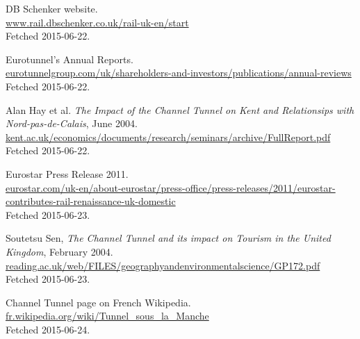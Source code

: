 \documentclass[12pt]{article} %
\begin{document}
\begin{thebibliography}{99}
	DB Schenker website.\\
	\url{www.rail.dbschenker.co.uk/rail-uk-en/start}\\
	Fetched 2015-06-22.

	Eurotunnel's Annual Reports.\\
	\url{eurotunnelgroup.com/uk/shareholders-and-investors/publications/annual-reviews}\\
	Fetched 2015-06-22.

	Alan Hay et al. \textit{The Impact of the Channel Tunnel on Kent and Relationsips with Nord-pas-de-Calais}, June 2004.\\
	\url{kent.ac.uk/economics/documents/research/seminars/archive/FullReport.pdf}\\
	Fetched 2015-06-22.

	Eurostar Press Release 2011.\\
	\url{eurostar.com/uk-en/about-eurostar/press-office/press-releases/2011/eurostar-contributes-rail-renaissance-uk-domestic}\\
	Fetched 2015-06-23.

	Soutetsu Sen, \emph{The Channel Tunnel and its impact on
Tourism in the United Kingdom}, February 2004.\\
	\url{reading.ac.uk/web/FILES/geographyandenvironmentalscience/GP172.pdf}\\
	Fetched 2015-06-23.

	Channel Tunnel page on French Wikipedia.\\
	\url{fr.wikipedia.org/wiki/Tunnel_sous_la_Manche}\\
	Fetched 2015-06-24.

\end{thebibliography}
\end{document}
